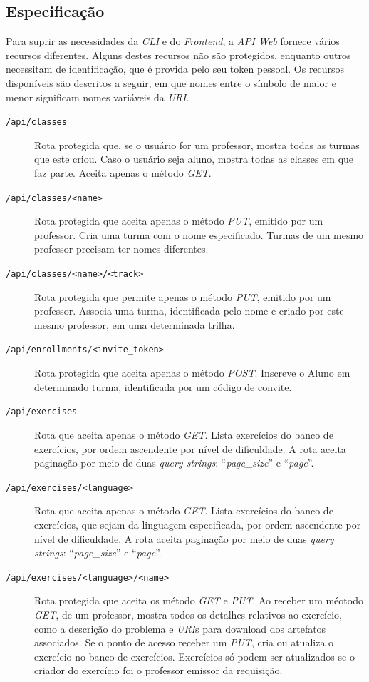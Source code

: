 \subsection{Especificação}
Para suprir as necessidades da \emph{CLI} e do 
\emph{Frontend}, a \emph{API Web} fornece vários recursos diferentes. Alguns destes recursos não são protegidos, enquanto outros necessitam de identificação, que é provida pelo seu token pessoal. Os recursos disponíveis são
descritos a seguir, em que nomes entre o símbolo de maior e menor significam nomes variáveis 
da \emph{URI}.
\begin{description}
\item[\texttt{/api/classes}]  Rota protegida que, se o usuário for um professor, mostra todas as turmas que este criou. Caso o usuário seja aluno, mostra todas as classes em que faz parte. 
Aceita apenas o método \emph{GET}.
\item[\texttt{/api/classes/<name>}] Rota protegida que aceita apenas o método \emph{PUT}, emitido por 
um professor. Cria uma turma com o nome especificado. Turmas de um mesmo professor precisam 
ter nomes diferentes.
\item[\texttt{/api/classes/<name>/<track>}] Rota protegida que permite apenas o método \emph{PUT}, emitido por 
um professor. Associa uma turma, identificada pelo nome e criado por este mesmo professor, em uma determinada trilha.
\item[\texttt{/api/enrollments/<invite\_token>}] Rota protegida que aceita apenas o método \emph{POST}. Inscreve o Aluno em determinado turma, identificada por um código de convite.
\item[\texttt{/api/exercises}] Rota que aceita apenas o método \emph{GET}. Lista exercícios do banco 
de exercícios, por ordem ascendente por nível de dificuldade. A rota aceita paginação por meio 
de duas \emph{query strings}: ``\emph{page\_size}'' e ``\emph{page}''.
\item[\texttt{/api/exercises/<language>}] Rota que aceita apenas o método \emph{GET}. Lista exercícios do banco 
de exercícios, que sejam da linguagem especificada, por ordem ascendente por nível de dificuldade. A rota aceita paginação por meio 
de duas \emph{query strings}: ``\emph{page\_size}'' e ``\emph{page}''.
\item[\texttt{/api/exercises/<language>/<name>}] Rota protegida que aceita os método \emph{GET} e
\emph{PUT}. Ao receber um méotodo \emph{GET}, de um professor, mostra todos os detalhes relativos ao exercício, como a descrição do problema e \emph{URI}s para download dos artefatos associados. Se o ponto de acesso receber um \emph{PUT}, cria ou atualiza o exercício no banco de exercícios. Exercícios só podem ser atualizados se o criador do exercício foi o professor emissor da requisição.

\end{description}
